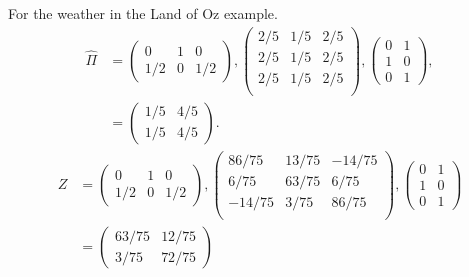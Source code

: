 \documentclass[12pt]{article}
\begin{document}
\begin{example}
    For the weather in the Land of Oz example.
    \begin{align*}
        \hat{\Pi} &=
        \begin{pmatrix}
            0 & 1 & 0 \\
            1/2 & 0 & 1/2
        \end{pmatrix}
        ,
        \begin{pmatrix}
            2/5 & 1/5 & 2/5 \\
            2/5 & 1/5 & 2/5 \\
            2/5 & 1/5 & 2/5 \\
        \end{pmatrix}
        ,
        \begin{pmatrix}
            0 & 1 \\
            1 & 0 \\
            0 & 1
        \end{pmatrix}
        , \\
        & =
        \begin{pmatrix}
            1/5 & 4/5 \\
            1/5 & 4/5
        \end{pmatrix}
        .
    \end{align*}
    \begin{align*}
        Z &=
        \begin{pmatrix}
            0 & 1 & 0 \\
            1/2 & 0 & 1/2
        \end{pmatrix}
        ,
        \begin{pmatrix}
            86/75 & 13/75 & -14/75 \\
            6/75 & 63/75 & 6/75 \\
            -14/75 & 3/75 & 86/75 \\
        \end{pmatrix}
        ,
        \begin{pmatrix}
            0 & 1 \\
            1 & 0 \\
            0 & 1
        \end{pmatrix}
        \\
        & =
        \begin{pmatrix}
            63/75 & 12/75 \\
            3/75 & 72/75
        \end{pmatrix}
    \end{align*}

\end{example}
\end{document}
